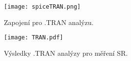 \begin{figure}[h!]
    \centering
    \texttt{[image: spiceTRAN.png]}
    \caption{Zapojení pro .TRAN analýzu.}
    \label{fig:spice1.png}
\end{figure}

\begin{figure}[h!]
    \centering
    \texttt{[image: TRAN.pdf]}
    \caption{Výsledky .TRAN analýzy pro měření SR.}
    \label{fig:OVS.pdf}
\end{figure}


